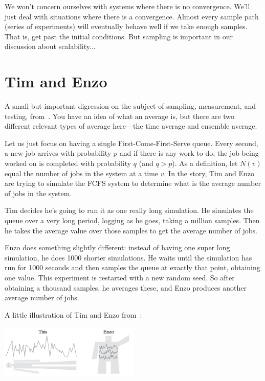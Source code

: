 \documentclass[a4paper]{report}
\begin{document}
We won't concern ourselves with systems where there is no convergence. We'll just deal with situations where there is a convergence. Almost every sample path (series of experiments) will eventually behave well if we take enough samples. That is, get past the initial conditions. But sampling is important in our discussion about scalability...

\section*{Tim and Enzo}
A small but important digression on the subject of sampling, measurement, and testing, from~\cite{pmd}. You have an idea of what an average is, but there are two different relevant types of average here---the time average and ensemble average. 

Let us just focus on having a single First-Come-First-Serve queue. Every second, a new job arrives with probability $p$ and if there is any work to do, the job being worked on is completed with probability $q$ (and $q > p$). As a definition, let $N(v)$ equal the number of jobs in the system at a time $v$. In the story, Tim and Enzo are trying to simulate the FCFS system to determine what is the average number of jobs in the system. 

Tim decides he's going to run it as one really long simulation. He simulates the queue over a very long period, logging as he goes, taking a million samples. Then he takes the average value over those samples to get the average number of jobs.

Enzo does something slightly different: instead of having one super long simulation, he does 1000 shorter simulations. He waits until the simulation has run for 1000 seconds and then samples the queue at exactly that point, obtaining one value. This experiment is restarted with a new random seed. So after obtaining a thousand samples, he averages these, and Enzo produces another average number of jobs.

A little illustration of Tim and Enzo from~\cite{pmd}:

\begin{center}
	\includegraphics[width=0.5\textwidth]{images/timenzo.png}
\end{center}
\end{document}

